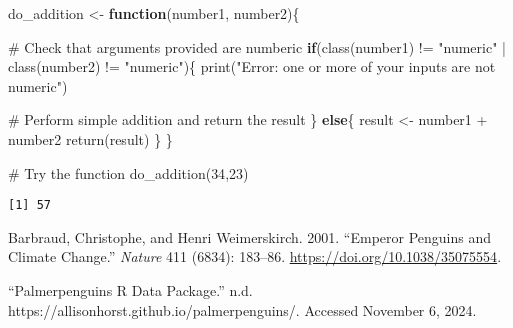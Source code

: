 \documentclass[
  letterpaper,
  DIV=11,
  numbers=noendperiod]{scrartcl}
\newenvironment{Shaded}{\begin{snugshade}}{\end{snugshade}}
\newcommand{\CommentTok}[1]{\textcolor[rgb]{0.37,0.37,0.37}{#1}}
\newcommand{\ControlFlowTok}[1]{\textcolor[rgb]{0.00,0.23,0.31}{\textbf{#1}}}
\newcommand{\DecValTok}[1]{\textcolor[rgb]{0.68,0.00,0.00}{#1}}
\newcommand{\FunctionTok}[1]{\textcolor[rgb]{0.28,0.35,0.67}{#1}}
\newcommand{\NormalTok}[1]{\textcolor[rgb]{0.00,0.23,0.31}{#1}}
\newcommand{\OtherTok}[1]{\textcolor[rgb]{0.00,0.23,0.31}{#1}}
\newcommand{\SpecialCharTok}[1]{\textcolor[rgb]{0.37,0.37,0.37}{#1}}
\newcommand{\StringTok}[1]{\textcolor[rgb]{0.13,0.47,0.30}{#1}}
\newlength{\cslhangindent}
\newenvironment{CSLReferences}[2] %
 {\begin{list}{}{%
  \setlength{\itemindent}{0pt}
  \setlength{\leftmargin}{0pt}
  \setlength{\parsep}{0pt}
  \ifodd #1
   \setlength{\leftmargin}{\cslhangindent}
   \setlength{\itemindent}{-1\cslhangindent}
  \fi
  \setlength{\itemsep}{#2\baselineskip}}}
 {\end{list}}
\begin{document}
\begin{Shaded}
\begin{Highlighting}[]
\NormalTok{do\_addition }\OtherTok{\textless{}{-}} \ControlFlowTok{function}\NormalTok{(number1, number2)\{}
        
        \CommentTok{\# Check that arguments provided are numberic}
        \ControlFlowTok{if}\NormalTok{(}\FunctionTok{class}\NormalTok{(number1) }\SpecialCharTok{!=} \StringTok{"numeric"} \SpecialCharTok{|} \FunctionTok{class}\NormalTok{(number2) }\SpecialCharTok{!=} \StringTok{"numeric"}\NormalTok{)\{}
                \FunctionTok{print}\NormalTok{(}\StringTok{"Error: one or more of your inputs are not numeric"}\NormalTok{)}
                
        \CommentTok{\# Perform simple addition and return the result}
\NormalTok{        \} }\ControlFlowTok{else}\NormalTok{\{}
\NormalTok{                result }\OtherTok{\textless{}{-}}\NormalTok{ number1 }\SpecialCharTok{+}\NormalTok{ number2}
                \FunctionTok{return}\NormalTok{(result)}
\NormalTok{        \}}
\NormalTok{\}}

\CommentTok{\# Try the function}
\FunctionTok{do\_addition}\NormalTok{(}\DecValTok{34}\NormalTok{,}\DecValTok{23}\NormalTok{)}
\end{Highlighting}
\end{Shaded}

\begin{verbatim}
[1] 57
\end{verbatim}

\label{refs}
\begin{CSLReferences}{1}{0}
Barbraud, Christophe, and Henri Weimerskirch. 2001. {``Emperor Penguins
and Climate Change.''} \emph{Nature} 411 (6834): 183--86.
\url{https://doi.org/10.1038/35075554}.

{``Palmerpenguins {R} Data Package.''} n.d.
https://allisonhorst.github.io/palmerpenguins/. Accessed November 6,
2024.

\end{CSLReferences}
\end{document}

